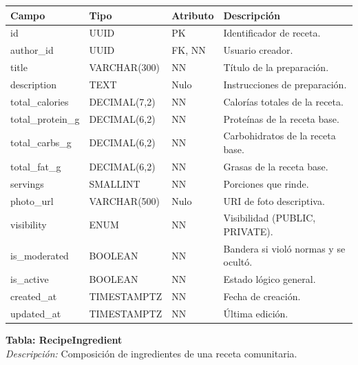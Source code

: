 \documentclass[12pt]{article}
\begin{document}
\begin{table}[h!]
    \centering
    \renewcommand{\arraystretch}{1.2}
    \small
    \begin{tabular}{|p{3.5cm}|p{2.7cm}|p{2cm}|p{6.5cm}|}
        \hline
        \rowcolor[HTML]{EFEFEF}
        \textbf{Campo} & \textbf{Tipo} & \textbf{Atributo} & \textbf{Descripción} \\ \hline
        id & UUID & PK & Identificador de receta. \\ \hline
        author\_id & UUID & FK, NN & Usuario creador. \\ \hline
        title & VARCHAR(300) & NN & Título de la preparación. \\ \hline
        description & TEXT & Nulo & Instrucciones de preparación. \\ \hline
        total\_calories & DECIMAL(7,2) & NN & Calorías totales de la receta. \\ \hline
        total\_protein\_g & DECIMAL(6,2) & NN & Proteínas de la receta base. \\ \hline
        total\_carbs\_g & DECIMAL(6,2) & NN & Carbohidratos de la receta base. \\ \hline
        total\_fat\_g & DECIMAL(6,2) & NN & Grasas de la receta base. \\ \hline
        servings & SMALLINT & NN & Porciones que rinde. \\ \hline
        photo\_url & VARCHAR(500) & Nulo & URI de foto descriptiva. \\ \hline
        visibility & ENUM & NN & Visibilidad (PUBLIC, PRIVATE). \\ \hline
        is\_moderated & BOOLEAN & NN & Bandera si violó normas y se ocultó. \\ \hline
        is\_active & BOOLEAN & NN & Estado lógico general. \\ \hline
        created\_at & TIMESTAMPTZ & NN & Fecha de creación. \\ \hline
        updated\_at & TIMESTAMPTZ & NN & Última edición. \\ \hline
    \end{tabular}
\end{table}
\newpage
\noindent\textbf{Tabla: RecipeIngredient} \\
\textit{Descripción:} Composición de ingredientes de una receta comunitaria.
\end{document}
